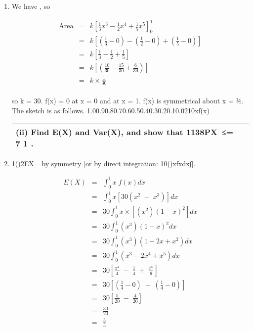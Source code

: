 \documentclass[a4paper,30pt]{article}
\begin{document}
\begin{enumerate}
\item We have , so 


\begin{eqnarray*}
\mbox{Area} 
&=& k \left[ \frac{1}{3}x^3 - \frac{1}{2}x^4 + \frac{1}{5}x^5 \right]^{1}_{0}\\
&=& k \left[  \left( \frac{1}{3} - 0 \right)  -  \left(\frac{1}{2} - 0 \right) +  \left( \frac{1}{5} - 0 \right) \right]\\
&=& k \left[  \frac{1}{3} - \frac{1}{2} + \frac{1}{5} \right]\\
&=& k \left[  \left(\frac{10}{30} - \frac{15}{30} + \frac{6}{30}\right)\right]\\
&=& k \times \frac{1}{30} \\
\end{eqnarray*}


so k = 30.
f(x) = 0 at x = 0 and at x = 1. f(x) is symmetrical about x = ½. The sketch is as follows. 1.00.90.80.70.60.50.40.30.20.10.0210xf(x)

    \begin{table}[ht!]
     \centering
     \begin{tabular}{|p{15cm}|}
     \hline        
\noindent (ii) Find E(X) and Var(X), and show that 1138PX≤=
7
1
.
\\ \hline
      \end{tabular}
    \end{table}

\item 1()2EX= by symmetry [or by direct integration: 10()xfxdx∫].

\begin{eqnarray*}
E(X) &=& \int^{1}_{0} x \;f(x) dx \\
&=& \int^{1}_{0} x[30(x^2\;-\;x^3)] dx \\
&=& 30 \int^{1}_{0} x  \times \left[(x^2)(1-x)^2\right] dx\\
&=& 30 \int^{1}_{0} (x^3)(1-x)^2 dx\\
&=& 30 \int^{1}_{0} (x^3)(1-2x + x^2) dx\\
&=& 30 \int^{1}_{0} (x^3 -2x^4 + x^5) dx\\
&=& 30 \left[ \frac{x^4}{4}  \;-\;  \frac{1}{4} \; + \; \frac{x^6}{6}  \right]\\
&=& 30 \left[ \left( \frac{1}{4}- 0 \right) \;-\; \left( \frac{1}{4}- 0 \right)  \right]\\
&=& 30 \left[  \frac{5}{20} \;-\; \frac{4}{20} \right]\\
&=&  \frac{30}{20} \\
&=&  \frac{3}{5}\\
\end{eqnarray*}


\end{enumerate}
\end{document}
